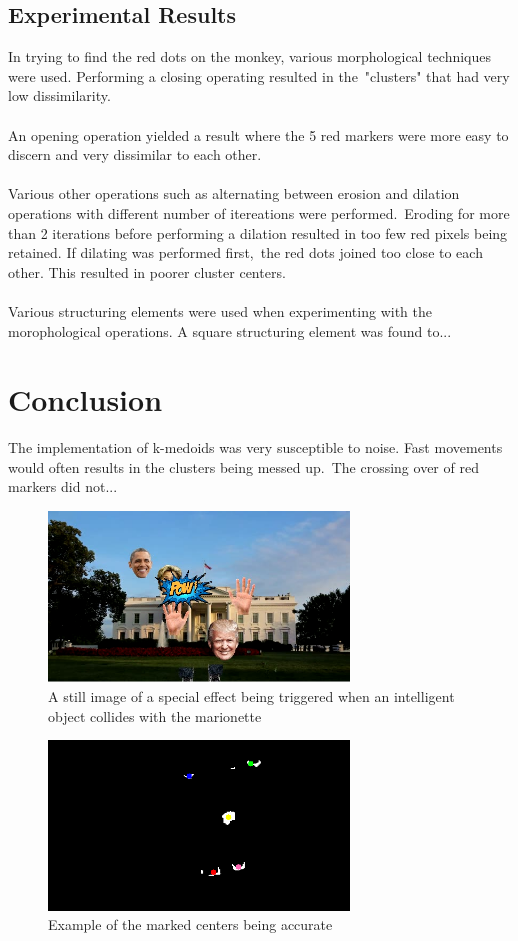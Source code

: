 \documentclass[12pt,a4paper]{article}
\begin{document}
      \subsection{Experimental Results}
      In trying to find the red dots on the monkey, various morphological techniques were used. Performing a closing operating resulted in the\
      "clusters" that had very low dissimilarity.
      \\\\
      An opening operation yielded a result where the 5 red markers were more easy to discern and very dissimilar to each other.
      \\\\
      Various other operations such as alternating between erosion and dilation operations with different number of itereations were performed.\
      Eroding for more than 2 iterations before performing a dilation resulted in too few red pixels being retained. If dilating was performed first,\
      the red dots joined too close to each other. This resulted in poorer cluster centers.
      \\\\
      Various structuring elements were used when experimenting with the morophological operations. A square structuring element was found to...

    \section{Conclusion}
    The implementation of k-medoids was very susceptible to noise. Fast movements would often results in the clusters being messed up.\
    The crossing over of red markers did not...

    \begin{figure}[h]
      \caption{A still image of a special effect being triggered when an intelligent object collides with the marionette}
      \includegraphics[width=8cm]{pow}
    \end{figure}

    \begin{figure}[h]
      \caption{Example of the marked centers being accurate}
      \includegraphics[width=8cm]{192}
    \end{figure}
\end{document}
